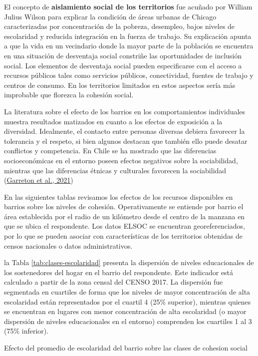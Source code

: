 \documentclass[
  12pt,
]{book}
\begin{document}
El concepto de \textbf{aislamiento social de los territorios} fue acuñado por William Julius Wilson para explicar la condición de áreas urbanas de Chicago caracterizadas por concentración de la pobreza, desempleo, bajos niveles de escolaridad y reducida integración en la fuerza de trabajo. Su explicación apunta a que la vida en un vecindario donde la mayor parte de la población se encuentra en una situación de desventaja social constriñe las oportunidades de inclusión social. Los elementos de desventaja social pueden especificarse con el acceso a recursos públicos tales como servicios públicos, conectividad, fuentes de trabajo y centros de consumo. En los territorios limitados en estos aspectos sería más improbable que florezca la cohesión social.

La literatura sobre el efecto de los barrios en los comportamientos individuales muestra resultados matizados en cuanto a los efectos de exposición a la diversidad. Idealmente, el contacto entre personas diversas debiera favorecer la tolerancia y el respeto, si bien algunos destacan que también ello puede desatar conflictos y competencia. En Chile se ha mostrado que las diferencias socioeconómicas en el entorno poseen efectos negativos sobre la sociabilidad, mientras que las diferencias étnicas y culturales favorecen la sociabilidad (\protect\hyperlink{ref-garreton_social_2021}{Garreton et al., 2021})

En las siguientes tablas revisamos los efectos de los recursos disponibles en barrios sobre los niveles de cohesión. Operativamente se entiende por barrio el área establecida por el radio de un kilómetro desde el centro de la manzana en que se ubica el respondente. Los datos ELSOC se encuentran georeferenciados, por lo que se pueden asociar con características de los territorios obtenidas de censos nacionales o datos administrativos.

la Tabla \ref{tab:clases-escolaridad} presenta la dispersión de niveles educacionales de los sostenedores del hogar en el barrio del respondente. Este indicador está calculado a partir de la zona censal del CENSO 2017. La dispersión fue segmentada en cuartiles de forma que los niveles de mayor concentración de alta escolaridad están representados por el cuartil 4 (25\% superior), mientras quienes se encuentran en lugares con menor concentración de alta escolaridad (o mayor dispersión de niveles educacionales en el entorno) comprenden los cuartiles 1 al 3 (75\% inferior).

\label{tab:clases-escolaridad}Efecto del promedio de escolaridad del barrio sobre las clases de cohesion social
\end{document}
